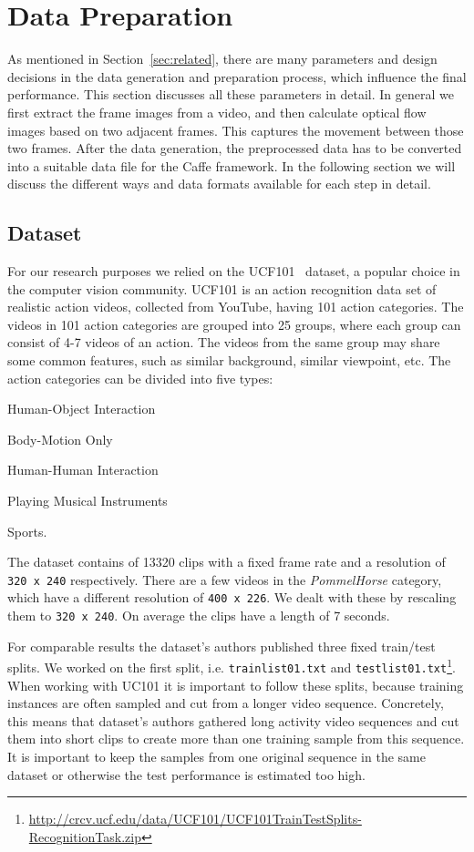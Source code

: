 \section{Data Preparation}
\label{sec:data}

As mentioned in Section~\ref{sec:related}, there are many parameters and design decisions in the data generation and preparation process, which influence the final performance.
This section discusses all these parameters in detail.
In general we first extract the frame images from a video, and then calculate optical flow images based on two adjacent frames.
This captures the movement between those two frames.
After the data generation, the preprocessed data has to be converted into a suitable data file for the Caffe framework.
In the following section we will discuss the different ways and data formats available for each step in detail.

\subsection{Dataset}
For our research purposes we relied on the UCF101~\cite{soomro2012ucf101} dataset, a popular choice in the computer vision community.
UCF101 is an action recognition data set of realistic action videos, collected from YouTube, having 101 action categories.
The videos in 101 action categories are grouped into 25 groups, where each group can consist of 4-7 videos of an action.
The videos from the same group may share some common features, such as similar background, similar viewpoint, etc.
The action categories can be divided into five types:
\begin{enumerate*}
	\item Human-Object Interaction
	\item Body-Motion Only
	\item Human-Human Interaction
	\item Playing Musical Instruments
	\item Sports.
\end{enumerate*}
The dataset contains of 13320 clips with a fixed frame rate and a resolution of \texttt{320 x 240} respectively.
There are a few videos in the \emph{PommelHorse} category, which have a different resolution of \texttt{400 x 226}.
We dealt with these by rescaling them to \texttt{320 x 240}.
On average the clips have a length of 7 seconds.

For comparable results the dataset's authors published three fixed train/test splits.
We worked on the first split, i.e. \texttt{trainlist01.txt} and \texttt{testlist01.txt}\footnote{ \url{http://crcv.ucf.edu/data/UCF101/UCF101TrainTestSplits-RecognitionTask.zip}}.
When working with UC101 it is important to follow these splits, because training instances are often sampled and cut from a longer video sequence.
Concretely, this means that dataset's authors gathered long activity video sequences and cut them into short clips to create more than one training sample from this sequence.
It is important to keep the samples from one original sequence in the same dataset or otherwise the test performance is estimated too high.

